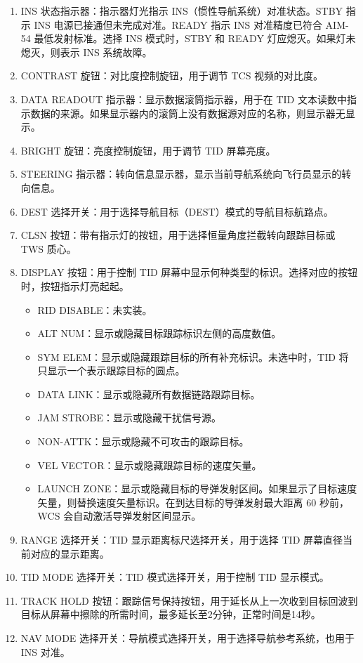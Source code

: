 \begin{enumerate}
  \item INS 状态指示器：指示器灯光指示 INS（惯性导航系统）对准状态。STBY 指示 INS 电源已接通但未完成对准。READY 指示 INS 对准精度已符合 AIM-54 最低发射标准。选择 INS 模式时，STBY 和 READY 灯应熄灭。如果灯未熄灭，则表示 INS 系统故障。
  \item CONTRAST 旋钮：对比度控制旋钮，用于调节 TCS 视频的对比度。
  \item DATA READOUT 指示器：显示数据滚筒指示器，用于在 TID 文本读数中指示数据的来源。如果显示器内的滚筒上没有数据源对应的名称，则显示器无显示。
  \item BRIGHT 旋钮：亮度控制旋钮，用于调节 TID 屏幕亮度。
  \item STEERING 指示器：转向信息显示器，显示当前导航系统向飞行员显示的转向信息。
  \item DEST 选择开关：用于选择导航目标（DEST）模式的导航目标航路点。
  \item CLSN 按钮：带有指示灯的按钮，用于选择恒量角度拦截转向跟踪目标或 TWS 质心。
  \item DISPLAY 按钮：用于控制 TID 屏幕中显示何种类型的标识。选择对应的按钮时，按钮指示灯亮起起。
  \begin{itemize}
    \item RID DISABLE：未实装。
    \item ALT NUM：显示或隐藏目标跟踪标识左侧的高度数值。
    \item SYM ELEM：显示或隐藏跟踪目标的所有补充标识。未选中时，TID 将只显示一个表示跟踪目标的圆点。
    \item DATA LINK：显示或隐藏所有数据链路跟踪目标。
    \item JAM STROBE：显示或隐藏干扰信号源。
    \item NON-ATTK：显示或隐藏不可攻击的跟踪目标。
    \item VEL VECTOR：显示或隐藏跟踪目标的速度矢量。
    \item LAUNCH ZONE：显示或隐藏目标的导弹发射区间。如果显示了目标速度矢量，则替换速度矢量标识。在到达目标的导弹发射最大距离 60 秒前，WCS 会自动激活导弹发射区间显示。
  \end{itemize}
  \item RANGE 选择开关：TID 显示距离标尺选择开关，用于选择 TID 屏幕直径当前对应的显示距离。
  \item TID MODE 选择开关：TID 模式选择开关，用于控制 TID 显示模式。
  \item TRACK HOLD 按钮：跟踪信号保持按钮，用于延长从上一次收到目标回波到目标从屏幕中擦除的所需时间，最多延长至2分钟，正常时间是14秒。
  \item NAV MODE 选择开关：导航模式选择开关，用于选择导航参考系统，也用于 INS 对准。
\end{enumerate}


